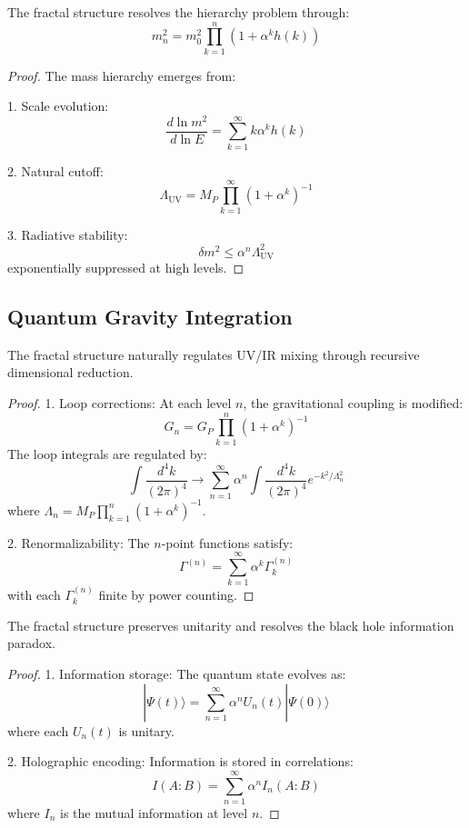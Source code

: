 \documentclass{article}
\begin{document}
\begin{theorem}
The fractal structure resolves the hierarchy problem through:
\[
m_n^2 = m_0^2 \prod_{k=1}^n (1 + \alpha^k h(k))
\]
\end{theorem}

\begin{proof}
The mass hierarchy emerges from:

1. Scale evolution:
   \[
   \frac{d\ln m^2}{d\ln E} = \sum_{k=1}^{\infty} k\alpha^k h(k)
   \]
   
2. Natural cutoff:
   \[
   \Lambda_{\text{UV}} = M_P \prod_{k=1}^{\infty} (1 + \alpha^k)^{-1}
   \]
   
3. Radiative stability:
   \[
   \delta m^2 \leq \alpha^n \Lambda_{\text{UV}}^2
   \]
   exponentially suppressed at high levels.
\end{proof}

\subsection{Quantum Gravity Integration}

\begin{theorem}
The fractal structure naturally regulates UV/IR mixing through recursive dimensional reduction.
\end{theorem}

\begin{proof}
1. Loop corrections:
   At each level $n$, the gravitational coupling is modified:
   \[
   G_n = G_P \prod_{k=1}^n (1 + \alpha^k)^{-1}
   \]
   The loop integrals are regulated by:
   \[
   \int \frac{d^4k}{(2\pi)^4} \to \sum_{n=1}^{\infty} \alpha^n \int \frac{d^4k}{(2\pi)^4} e^{-k^2/\Lambda_n^2}
   \]
   where $\Lambda_n = M_P \prod_{k=1}^n (1 + \alpha^k)^{-1}$.

2. Renormalizability:
   The $n$-point functions satisfy:
   \[
   \Gamma^{(n)} = \sum_{k=1}^{\infty} \alpha^k \Gamma_k^{(n)}
   \]
   with each $\Gamma_k^{(n)}$ finite by power counting.
\end{proof}

\begin{theorem}
The fractal structure preserves unitarity and resolves the black hole information paradox.
\end{theorem}

\begin{proof}
1. Information storage:
   The quantum state evolves as:
   \[
   |\Psi(t)\rangle = \sum_{n=1}^{\infty} \alpha^n U_n(t)|\Psi(0)\rangle
   \]
   where each $U_n(t)$ is unitary.

2. Holographic encoding:
   Information is stored in correlations:
   \[
   I(A:B) = \sum_{n=1}^{\infty} \alpha^n I_n(A:B)
   \]
   where $I_n$ is the mutual information at level $n$.
\end{proof}
\end{document}

